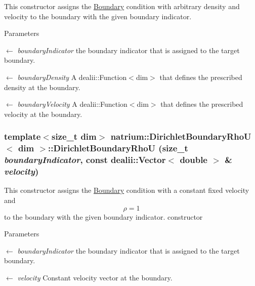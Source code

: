 This constructor assigns the \hyperlink{classnatrium_1_1Boundary}{Boundary} condition with arbitrary density and velocity to the boundary with the given boundary indicator. 
\begin{DoxyParams}{Parameters}
\item[\mbox{$\leftarrow$} {\em boundaryIndicator}]the boundary indicator that is assigned to the target boundary. \item[\mbox{$\leftarrow$} {\em boundaryDensity}]A dealii::Function$<$dim$>$ that defines the prescribed density at the boundary. \item[\mbox{$\leftarrow$} {\em boundaryVelocity}]A dealii::Function$<$dim$>$ that defines the prescribed velocity at the boundary. \end{DoxyParams}
\hypertarget{classnatrium_1_1DirichletBoundaryRhoU_aefca829931a4c3e9c3f65e5889533c45}{
\subsubsection[{DirichletBoundaryRhoU}]{\setlength{\rightskip}{0pt plus 5cm}template$<$size\_\-t dim$>$ {\bf natrium::DirichletBoundaryRhoU}$<$ dim $>$::{\bf DirichletBoundaryRhoU} (size\_\-t {\em boundaryIndicator}, \/  const dealii::Vector$<$ double $>$ \& {\em velocity})}}
\label{classnatrium_1_1DirichletBoundaryRhoU_aefca829931a4c3e9c3f65e5889533c45}


This constructor assigns the \hyperlink{classnatrium_1_1Boundary}{Boundary} condition with a constant fixed velocity and \[ \rho = 1 \] to the boundary with the given boundary indicator. constructor


\begin{DoxyParams}{Parameters}
\item[\mbox{$\leftarrow$} {\em boundaryIndicator}]the boundary indicator that is assigned to the target boundary. \item[\mbox{$\leftarrow$} {\em velocity}]Constant velocity vector at the boundary. \end{DoxyParams}


